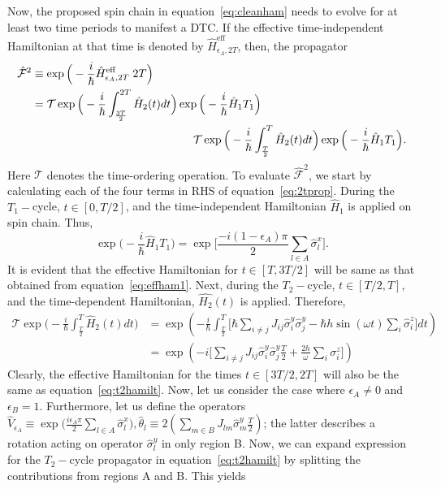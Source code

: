 \documentclass[12pt]{iopart}
\begin{document}
Now, the proposed spin chain in equation~\eqref{eq:cleanham} needs to evolve for at least two time periods to manifest a DTC. If the effective time-independent Hamiltonian at that time is denoted by $\hat{H}^{\mathrm{eff}}_{\epsilon_A, 2T}$, then, the propagator
\begin{align}
    \hat{\mathcal{F}}^{2} &\equiv \exp\Big(-\frac{i}{\hbar}\hat{H}_{\epsilon_A, 2T}^{\mathrm{eff}}\;2T\Big) \label{eq:heff}\\ 
    &= \mathcal{T}\exp\Big(-\frac{i}{\hbar}\int_{\frac{3T}{2}}^{2T}\hat{H}_2(t) dt\Big)
    \exp\Big(-\frac{i}{\hbar}\hat{H}_1T_1\Big)\nonumber\\
    & \hskip 5cm \mathcal{T}\exp\Big(-\frac{i}{\hbar}\int_{\frac{T}{2}}^{T}\hat{H}_2(t) dt\Big)\exp\Big(-\frac{i}{\hbar}\hat{H}_1T_1\Big).
    \label{eq:2tprop}
\end{align}
Here $\mathcal{T}$ denotes the time-ordering operation. 
To evaluate $\hat{\mathcal{F}}^2$, we start by calculating each of the four terms in RHS of equation~\ref{eq:2tprop}. During the $T_1-$cycle, $t\in[0,T/2]$, and the time-independent Hamiltonian $\hat{H}_1$ is applied on spin chain. Thus,
\begin{equation}
    \exp\Big(-\frac{i}{\hbar} \hat{H}_1 T_1\Big) = 	\exp\Bigg[\frac{-i(1-\epsilon_A)\pi}{2}\sum_{l \in A}\hat{\sigma}^x_l\Bigg].
    \label{eq:effham1}
\end{equation}	
It is evident that the effective Hamiltonian for $t \in[T, 3T/2]$ will be same as that obtained from equation~\eqref{eq:effham1}. Next, during the $T_2-$cycle, $t\in[T/2,T]$, and the time-dependent Hamiltonian, $\hat{H_2}(t)$ is applied. Therefore,
\begin{align}
    \mathcal{T}\exp\Big(-\frac{i}{\hbar}\int_{\frac{T}{2}}^{T}\hat{H}_2(t) dt\Big) &= \exp( -\frac{i}{\hbar}\int_{\frac{T}{2}}^{T}\Big[\hbar\sum_{i\neq j}J_{ij}\hat{\sigma}^y_i\hat{\sigma}^y_j-\hbar h\sin(\omega t)\sum_i\hat{\sigma}^z_i\Big] dt)\nonumber\\
    &= \exp(-i \Big[\sum_{i\neq j}J_{ij}\hat{\sigma}^y_i\hat{\sigma}^y_j \frac{T}{2} + \frac{2h}{\omega}\sum_i \sigma^z_i\Big])
    \label{eq:t2hamilt}
\end{align}
Clearly, the effective Hamiltonian for the times  $t \in[3T/2, 2T]$ will also be the same as equation~\eqref{eq:t2hamilt}. Now,	let us consider the case where $\epsilon_A \neq 0$ and $\epsilon_B=1$. Furthermore, let us define the operators $\displaystyle \hat{V}_{\epsilon_A} \equiv \exp\Big(\frac{i\epsilon_A \pi}{2}\sum_{l\in A}\hat{\sigma}^x_l\Big), \displaystyle \hat{\theta}_l \equiv 2 \left(\sum_{m \in B}J_{lm}\hat{\sigma}^y_m \frac{T}{2} \right)$; the latter describes a rotation acting on operator $\hat{\sigma}^y_l$ in only region B.  Now, we can expand expression for the  $T_2-$cycle propagator in equation~\ref{eq:t2hamilt} by splitting the contributions from regions A and B. This yields
\end{document}
